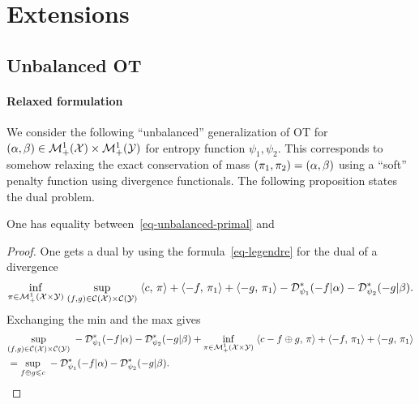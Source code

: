 
\section{Extensions}


\subsection{Unbalanced OT}
\label{sec-unbalanced}


\paragraph{Relaxed formulation}

We consider the following ``unbalanced'' generalization of OT for $(\alpha,\beta) \in \mathcal{M}_+^1(\mathcal{X}) \times \mathcal{M}_+^1(\mathcal{Y})$
for entropy function $\psi_1,\psi_2$.
%
This corresponds to somehow relaxing the exact conservation of mass $(\pi_1,\pi_2)=(\alpha,\beta)$ using a ``soft'' penalty function using divergence functionals.
%
The following proposition states the dual problem.

\begin{prop}One has equality between~\eqref{eq-unbalanced-primal} and
\end{prop}
\begin{proof}
One gets a dual by using the formula~\eqref{eq-legendre} for the dual of a divergence
\begin{align*}
	\underset{\pi \in \mathcal{M}_+^1(\mathcal{X} \times \mathcal{Y})}{\inf}\; \underset{(f,g) \in \mathcal{C}(\mathcal{X}) \times \mathcal{C}(\mathcal{Y})}{\sup}\;
		\langle c,\,\pi\rangle + \langle -f,\,\pi_1\rangle + \langle -g,\,\pi_1\rangle - \mathcal{D}_{\psi_1}^*(-f|\alpha) - \mathcal{D}_{\psi_2}^*(-g|\beta). 
\end{align*}
Exchanging the min and the max gives
\begin{align*}
	&\underset{(f,g) \in \mathcal{C}(\mathcal{X}) \times \mathcal{C}(\mathcal{Y})}{\sup}\;
	- \mathcal{D}_{\psi_1}^*(-f|\alpha) - \mathcal{D}_{\psi_2}^*(-g|\beta)	+ 
		\underset{\pi \in \mathcal{M}_+^1(\mathcal{X} \times \mathcal{Y})}{\inf}\; 
		\langle c-f \oplus g,\,\pi\rangle + \langle -f,\,\pi_1\rangle + \langle -g,\,\pi_1\rangle \\
	&= 	\underset{f \oplus g \leqslant c}{\sup}\;
	- \mathcal{D}_{\psi_1}^*(-f|\alpha) - \mathcal{D}_{\psi_2}^*(-g|\beta).
\end{align*}
\end{proof}


